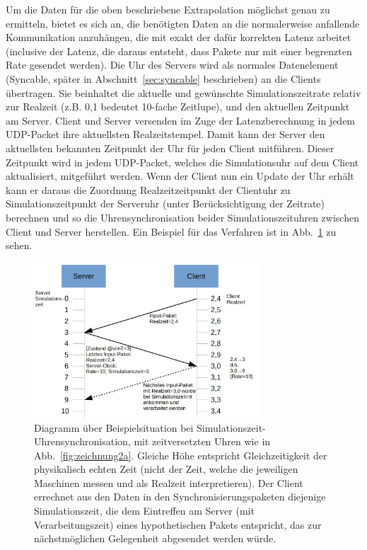 Um die Daten für die oben beschriebene Extrapolation möglichst genau zu ermitteln, bietet es sich an, die benötigten Daten an die normalerweise anfallende Kommunikation anzuhängen, die mit exakt der dafür korrekten Latenz arbeitet (inclusive der Latenz, die daraus entsteht, dass Pakete nur mit einer begrenzten Rate gesendet werden). Die Uhr des Servers wird als normales Datenelement (Syncable, später in Abschnitt~\ref{sec:syncable} beschrieben) an die Clients übertragen. Sie beinhaltet die aktuelle und gewünschte Simulationszeitrate relativ zur Realzeit (z.B. 0,1 bedeutet 10-fache Zeitlupe), und den aktuellen Zeitpunkt am Server. 
Client und Server versenden im Zuge der Latenzberechnung in jedem UDP-Packet ihre aktuellsten Realzeitstempel. Damit kann der Server den aktuellsten bekannten Zeitpunkt der Uhr für jeden Client mitführen. 
Dieser Zeitpunkt wird in jedem UDP-Packet, welches die Simulationsuhr auf dem Client aktualisiert, mitgeführt werden.
Wenn der Client nun ein Update der Uhr erhält kann er daraus die Zuordnung Realzeitzeitpunkt der Clientuhr zu Simulationszeitpunkt der Serveruhr (unter Berücksichtigung der Zeitrate) berechnen und so die Uhrensynchronisation beider Simulationszeituhren zwischen Client und Server herstellen. Ein Beispiel für das Verfahren ist in Abb.~\ref{fig:zeichnung3a} zu sehen.
\begin{figure}
    \centering
    \includegraphics[width=0.75\textwidth]{./Zeichnung3a.png}
    \caption{Diagramm über Beispielsituation bei Simulationszeit-Uhrensynchronisation, mit zeitversetzten Uhren wie in Abb.~\ref{fig:zeichnung2a}. 
Gleiche Höhe entspricht Gleichzeitigkeit der physikalisch echten Zeit 
(nicht der Zeit, welche die jeweiligen Maschinen messen und als Realzeit interpretieren). Der Client errechnet aus den Daten in den Synchronisierungspaketen diejenige Simulationszeit, die dem Eintreffen am Server (mit Verarbeitungszeit) eines hypothetischen Pakets entspricht, das zur nächstmöglichen Gelegenheit abgesendet werden würde.}
    \label{fig:zeichnung3a}
\end{figure}


